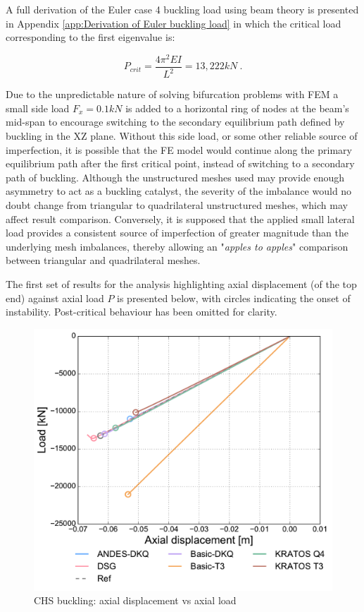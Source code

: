 A full derivation of the Euler case 4 buckling load using beam theory is presented in Appendix \ref{app:Derivation of Euler buckling load} in which the critical load corresponding to the first eigenvalue is:

\begin{equation} 
P_{crit} = \frac{4\pi^2 EI}{L^2} = 13, 222 kN
\label{eqchs_1}\ .
\end{equation}

Due to the unpredictable nature of solving bifurcation problems with FEM a small side load $F_x = 0.1 kN$ is added to a horizontal ring of nodes at the beam's mid-span to encourage switching to the secondary equilibrium path defined by buckling in the XZ plane. Without this side load, or some other reliable source of imperfection, it is possible that the FE model would continue along the primary equilibrium path after the first critical point, instead of switching to a secondary path of buckling. Although the unstructured meshes used may provide enough asymmetry to act as a buckling catalyst, the severity of the imbalance would no doubt change from triangular to quadrilateral unstructured meshes, which may affect result comparison. Conversely, it is supposed that the applied small lateral load provides a consistent source of imperfection  of greater magnitude than the underlying mesh imbalances, thereby allowing an "\textit{apples to apples}" comparison between triangular and quadrilateral meshes.

The first set of results for the analysis highlighting axial displacement (of the top end) against axial load $P$ is presented below, with circles indicating the onset of instability. Post-critical behaviour has been omitted for clarity.

\begin{figure}[H]
	\centering
	\def\svgwidth{\columnwidth}
	\includegraphics[width=12cm]{images/stability_chs_axial_disp.pdf}
	\caption{CHS buckling: axial displacement vs axial load}
	\label{pic:eulerchs1}
\end{figure}


